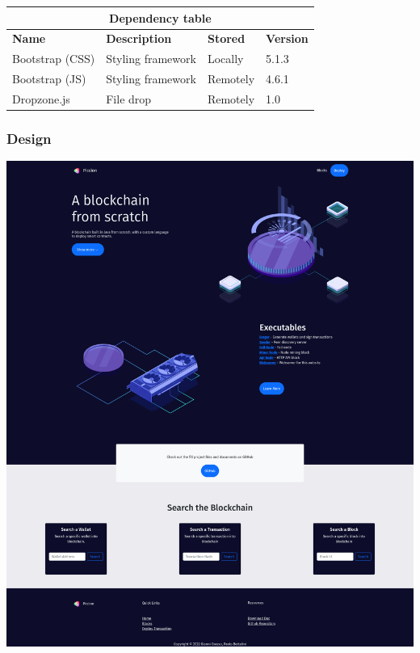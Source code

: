 \documentclass[../documentation.tex]{subfiles}
\begin{document}
\medskip

\bgroup{}
\def\arraystretch{1.5}
\begin{center}
    \begin{tabular}{ |p{3cm}|p{4cm}|p{2cm}|p{2cm}| }
        \hline
        \multicolumn{4}{|c|}{\textbf{Dependency table}} \\
        \hline
        \textbf{Name} & \textbf{Description} & \textbf{Stored} & \textbf{Version} \\
        \hline
        Bootstrap (CSS) & Styling framework & Locally & 5.1.3 \\
        \hline
        Bootstrap (JS) & Styling framework & Remotely & 4.6.1 \\
        \hline
        Dropzone.js & File drop & Remotely & 1.0 \\
        \hline
    \end{tabular}
\end{center}
\egroup{}

\pagebreak

\subsubsection{Design}


\includegraphics[width=\textwidth]{images/website1}
\end{document}
